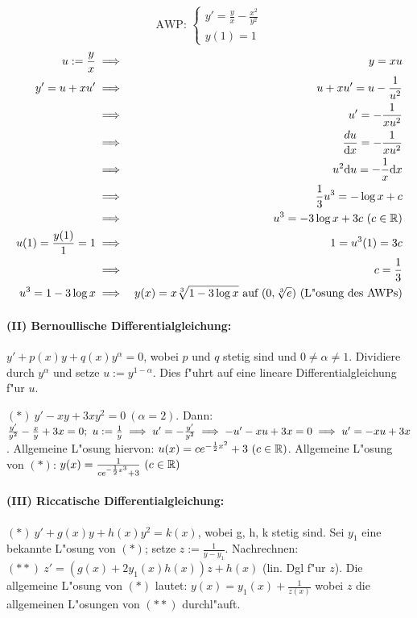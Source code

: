 \documentclass[a4paper,twoside,DIV15,BCOR12mm]{scrbook}
\begin{document}
\begin{beispiel}
$$\text{AWP: }\begin{cases}y'=\frac{y}{x}-\frac{x^2}{y^2}\\ y(1)=1\end{cases}$$
\begin{eqnarray*}
u:=\frac{y}{x}&\implies&y=xu\\
y'=u+xu'&\implies&u+xu'=u-\frac{1}{u^2}\\
&\implies& u'=-\frac{1}{xu^2}\\
&\implies& \frac{du}{\mathrm{d} x}=-\frac{1}{xu^2}\\
&\implies& u^2\mathrm{d} u=-\frac{1}{x}\mathrm{d} x\\
&\implies& \frac{1}{3}u^3=-\log x+c\\
&\implies& u^3=-3\log x+3c\ (c\in\mathbb{R})\\
u(1)=\frac{y(1)}{1}=1 & \implies & 1=u^3(1)=3c\\
&\implies &c=\frac{1}{3}\\
u^3=1-3\log x&\implies& y(x)=x\sqrt[3]{1-3\log x}\text{ auf }(0, \sqrt[3]{e})\text{ (L"osung des AWPs)}
\end{eqnarray*}
\end{beispiel}

\paragraph{(II) Bernoullische Differentialgleichung: }
$y'+p(x)y+q(x)y^\alpha=0$, wobei $p$ und $q$ stetig sind und $0\ne\alpha\ne 1$.
Dividiere durch $y^\alpha$ und setze $u:=y^{1-\alpha}$. Dies f"uhrt auf eine
lineare Differentialgleichung f"ur $u$.

\begin{beispiel}
$(*)\ y'-xy+3xy^2=0\ (\alpha=2)$. Dann: $\frac{y'}{y^2}-\frac{x}{y}+3x=0;\ 
u:=\frac{1}{y}\folgt u'=-\frac{y'}{y^2}\folgt -u'-xu+3x=0\folgt u'=-xu+3x$. Allgemeine L"osung hiervon:
$u(x)=ce^{-\frac{1}{2}x^2}+3\ (c\in\mathbb{R})$. Allgemeine L"osung von $(*)$:
$y(x)=\frac{1}{ce^{-\frac{1}{2}x^3}+3}\ (c\in\MdR)$
\end{beispiel}

\paragraph{(III) Riccatische Differentialgleichung: }
$(*)\ y'+g(x)y+h(x)y^2=k(x)$, wobei g, h, k stetig sind.
Sei $y_1$ eine bekannte L"osung von $(*)$; setze $z:=\frac{1}{y-y_1}$.
Nachrechnen: $(**)\ z'=(g(x)+2y_1(x)h(x))z+h(x)$ (lin. Dgl f"ur $z$). Die
allgemeine L"osung von $(*)$ lautet: $y(x)=y_1(x)+\frac{1}{z(x)}$ wobei
$z$ die allgemeinen L"osungen von $(**)$ durchl"auft.
\end{document}
